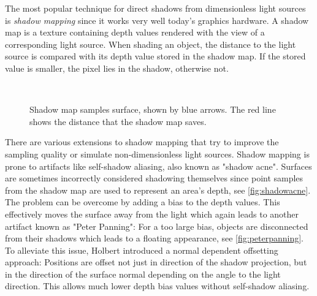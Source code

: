 \documentclass[thesis.tex]{subfiles}
\begin{document}
The most popular technique for direct shadows from dimensionless light sources is \emph{shadow mapping} \cite{bib:shadowmapping} since it works very well today's graphics hardware.
A shadow map is a texture containing depth values rendered with the view of a corresponding light source.
When shading an object, the distance to the light source is compared with its depth value stored in the shadow map.
If the stored value is smaller, the pixel lies in the shadow, otherwise not.


\begin{figure}[h]
\centering
{}
\\
\caption{\cite[p.351]{bib:RealtimeRenderingBook} Shadow map samples surface, shown by blue arrows. The red line shows the distance that the shadow map saves.}
\end{figure}
There are various extensions to shadow mapping that try to improve the sampling quality or simulate non-dimensionless light sources.
Shadow mapping is prone to artifacts like self-shadow aliasing, also known as "shadow acne".
Surfaces are sometimes incorrectly considered shadowing themselves since point samples from the shadow map are used to represent an area's depth, see \autoref{fig:shadowacne}.
The problem can be overcome by adding a bias to the depth values.
This effectively moves the surface away from the light which again leads to another artifact known as "Peter Panning":
For a too large bias, objects are disconnected from their shadows which leads to a floating appearance, see \autoref{fig:peterpanning}.
\\
To alleviate this issue, Holbert \cite{bib:normaloffsetshadowmapping} introduced a normal dependent offsetting approach:
Positions are offset not just in direction of the shadow projection, but in the direction of the surface normal depending on the angle to the light direction.
This allows much lower depth bias values without self-shadow aliasing.
\end{document}
